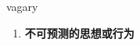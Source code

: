 
\begin{frame}
{\huge vagary}
\begin{center}
\begin{enumerate}\Large
  \item \textbf{不可预测的思想或行为}
\end{enumerate}
\end{center}
\end{frame}
